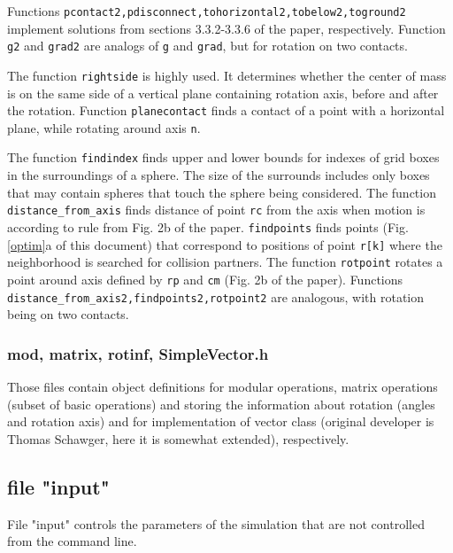 \documentclass[12pt]{article}
\begin{document}
Functions \texttt{pcontact2,pdisconnect,tohorizontal2,tobelow2,toground2} implement solutions from sections 3.3.2-3.3.6 of the paper, respectively. Function \texttt{g2} and \texttt{grad2} are analogs of \texttt{g} and \texttt{grad}, but for rotation on two contacts.

The function \texttt{rightside} is highly used. It determines whether the center of mass is on the same side of a vertical plane containing rotation axis, before and after the rotation. Function \texttt{planecontact} finds a contact of a point with a horizontal plane, while rotating around axis \texttt{n}.

The function \texttt{findindex} finds upper and lower bounds for indexes of grid boxes in the surroundings of a sphere. The size of the surrounds includes only boxes that may contain spheres that touch the sphere being considered. The function \texttt{distance\_from\_axis} finds distance of point \texttt{rc} from the axis when motion is according to rule from Fig. 2b of the paper. \texttt{findpoints} finds points (Fig. \ref{optim}a of this document) that correspond to positions of point \texttt{r[k]} where the neighborhood is searched for collision partners. The function \texttt{rotpoint} rotates a point around axis defined by \texttt{rp} and \texttt{cm} (Fig. 2b of the paper). Functions \texttt{distance\_from\_axis2,findpoints2,rotpoint2} are analogous, with rotation being on two contacts.

\subsubsection{mod, matrix, rotinf, SimpleVector.h}
Those files contain object definitions for modular operations, matrix operations (subset of basic operations) and storing the information about rotation (angles and rotation axis) and for implementation of vector class (original developer is Thomas Schawger, here it is somewhat extended), respectively.

\subsection{file "input"}
File "input" controls the parameters of the simulation that are not controlled from the command line.
\end{document}
